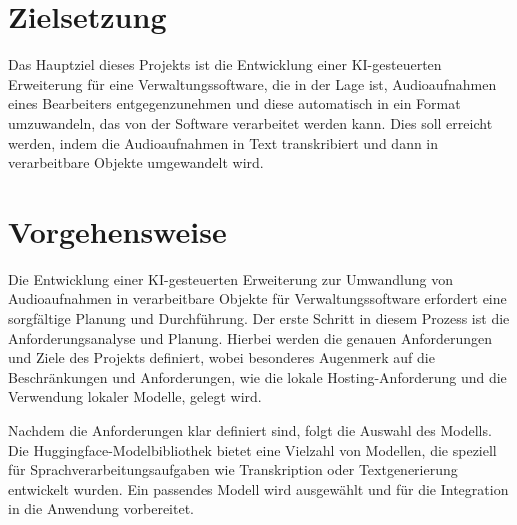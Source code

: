 \documentclass[12pt,a4paper,parskip=full]{scrartcl}
\begin{document}
\section*{Zielsetzung}
Das Hauptziel dieses Projekts ist die Entwicklung einer KI-gesteuerten Erweiterung für eine Verwaltungssoftware, die in der Lage ist, Audioaufnahmen eines Bearbeiters entgegenzunehmen und diese automatisch in ein Format umzuwandeln, das von der Software verarbeitet werden kann.
Dies soll erreicht werden, indem die Audioaufnahmen in Text transkribiert und dann in verarbeitbare Objekte umgewandelt wird.




\section*{Vorgehensweise}
Die Entwicklung einer KI-gesteuerten Erweiterung zur Umwandlung von Audioaufnahmen in verarbeitbare Objekte für Verwaltungssoftware erfordert eine sorgfältige Planung und Durchführung.
Der erste Schritt in diesem Prozess ist die Anforderungsanalyse und Planung.
Hierbei werden die genauen Anforderungen und Ziele des Projekts definiert, wobei besonderes Augenmerk auf die Beschränkungen und Anforderungen, wie die lokale Hosting-Anforderung und die Verwendung lokaler Modelle, gelegt wird.

Nachdem die Anforderungen klar definiert sind, folgt die Auswahl des Modells.
Die Huggingface-Modelbibliothek bietet eine Vielzahl von Modellen, die speziell für Sprachverarbeitungsaufgaben wie Transkription oder Textgenerierung entwickelt wurden. \cite{huggingface_hugging_nodate}
Ein passendes Modell wird ausgewählt und für die Integration in die Anwendung vorbereitet.
\end{document}
